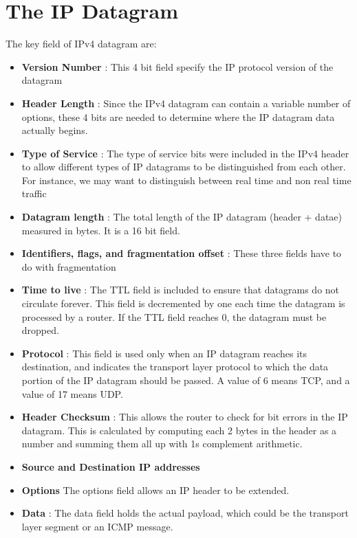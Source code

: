 \documentclass[12pt,letterpaper]{book}
\theoremstyle{definition}
\begin{document}
\section{The IP Datagram}

The key field of IPv4 datagram are:

\begin{itemize}
  \item \textbf{Version Number} : This 4 bit  field specify the IP protocol version of the datagram
  \item \textbf{Header Length}  : Since the IPv4 datagram can contain a variable number of options, these 4 bits are needed to determine where the IP datagram data actually begins.
  \item \textbf{Type of Service} : The type of service bits were included in the IPv4 header to allow different types of IP datagrams to be distinguished from each other. For instance, we may want to distinguish between real time and non real time traffic
  \item \textbf{Datagram length}  : The total length of the IP datagram (header + datae) measured in bytes. It is a 16 bit field.
  \item \textbf{Identifiers, flags, and fragmentation offset} : These three fields have to do with fragmentation
  \item \textbf{Time to live} : The TTL field is included to ensure that datagrams do not circulate forever. This field is decremented by one each time the datagram is processed by a router. If the TTL field reaches 0, the datagram must be dropped.
  \item \textbf{Protocol} : This field is used only when an IP datagram reaches its destination, and indicates the transport layer protocol to which the data portion of the IP datagram should be passed. A value of 6 means TCP, and a value of 17 means UDP.
  \item \textbf{Header Checksum} : This allows the router to check for bit errors in the IP datagram. This is calculated by computing each 2 bytes in the header as a number and summing them all up with 1s complement arithmetic.
  \item \textbf{Source and Destination IP addresses} 
  \item \textbf{Options}  The options field allows an IP header to be extended.
  \item \textbf{Data} : The data field holds the actual payload, which could be the transport layer segment or an ICMP message.
\end{itemize} 
\end{document}
